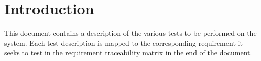\chapter{Introduction}
This document contains a description of the various tests to be performed on the system. Each test description is mapped to the corresponding requirement it seeks to test in the requirement traceability matrix in the end of the document.


